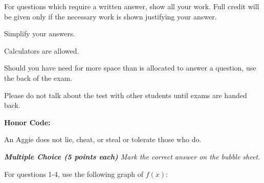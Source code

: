 \documentclass[11pt]{article}
\begin{document}
\Head
\begin{instructions}
\item For questions which require a written answer, show all your work.  Full credit will be given only if the necessary work is shown justifying your answer.
\item Simplify your answers.
\item Calculators are allowed.
\item Should you have need for more space than is allocated to answer a question, use the back of the exam.
\item Please do not talk about the test with other students until exams are handed back.
\item \textbf{Honor Code:}

\vspace{0.1in}
An Aggie does not lie, cheat, or steal or tolerate those who do.
\vspace{0.3in}

\par\noindent\makebox[2.5in]{\hrulefill} 
\par\noindent{}     
\end{instructions}
\newpage

\vspace{.2in}

\noindent \emph{{\bf Multiple Choice (5 points each)} Mark the correct
answer on the bubble sheet.}


For questions 1-4, use the following graph of $f(x)$:\\
\end{document}
